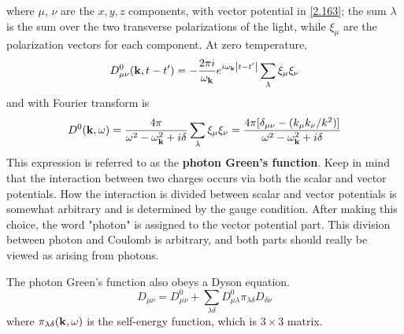 where $\mu$, $\nu$ are the $x,y,z$ components, with vector potential in \eqref{2.163}; the sum $\lambda$ is the sum over the two transverse polarizations of the light, while $\xi_\mu$ are the polarization vectors for each component.
At zero temperature,
\begin{equation}
  D^0_{\mu\nu}(\mathbf{k},t-t') = -\frac{2\pi i}{\omega_{\mathbf{k}}} e^{i\omega_{\mathbf{k}} \abs{t-t'}} \sum_\lambda \xi_\mu \xi_\nu \label{2.173}
\end{equation}
and with Fourier transform is
\begin{equation}\label{2.175}
  D^0(\mathbf{k},\omega) = \frac{4\pi}{\omega^2-\omega_{\mathbf{k}}^2 + i\delta} \sum_\lambda \xi_\mu \xi_\nu = \frac{4\pi[\delta_{\mu\nu}-(k_\mu k_\nu/k^2)]}{\omega^2-\omega_{\mathbf{k}}^2+ i\delta}
\end{equation}
This expression is referred to as the \textbf{photon Green's function}.
Keep in mind that the interaction between two charges occurs via both the scalar and vector potentials.
How the interaction is divided between scalar and vector potentials is somewhat arbitrary and is determined by the gauge condition.
After making this choice, the word "photon" is assigned to the vector potential part.
This division between photon and Coulomb is arbitrary, and both parts should really be viewed as arising from photons.

The photon Green's function also obeys a Dyson equation.
\begin{equation}
  D_{\mu\nu} = D^0_{\mu\nu} + \sum_{\lambda \delta} D^0_{\mu\lambda} \pi_{\lambda \delta} D_{\delta\nu}   \label{2.180}
\end{equation}
where $\pi_{\lambda \delta}(\mathbf{k},\omega)$ is the self-energy function, which is $3\times 3$ matrix.
